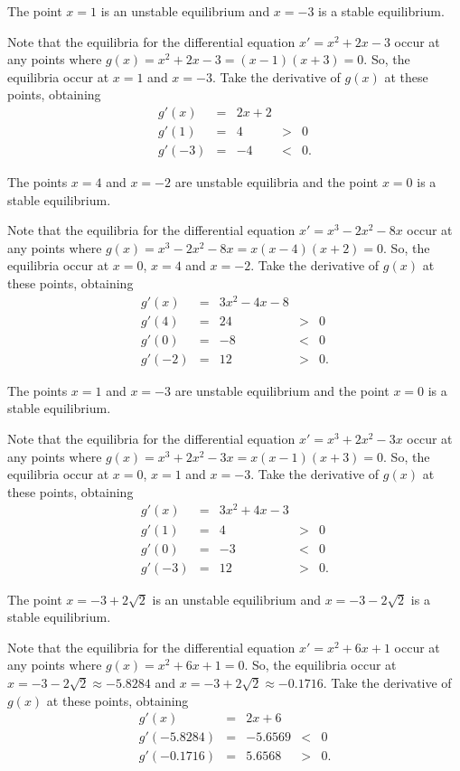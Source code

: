 \ans The point $x = 1$ is an unstable equilibrium and $x = -3$ is a stable
equilibrium.

\soln Note that the equilibria for the differential equation
$x' = x^2 + 2x - 3$ occur at any points where
$g(x) = x^2 + 2x - 3 = (x - 1)(x + 3) = 0$.
So, the equilibria occur at $x = 1$ and $x = -3$.  Take the
derivative of $g(x)$ at these points, obtaining
\[
\begin{array}{rcccl}
g'(x) & = & 2x + 2 \\
g'(1) & = & 4 & > & 0 \\
g'(-3) & = & -4 & < & 0.\end{array}
\]


\ans The points $x=4$ and $x = -2$ are unstable equilibria and the point 
$x = 0$ is a stable equilibrium.

\soln Note that the equilibria for the differential equation
$x' = x^3 - 2x^2 - 8x$ occur at any points where
$g(x) = x^3 - 2x^2 - 8x = x(x - 4)(x + 2) = 0$.
So, the equilibria occur at $x=0$, $x = 4$ and $x = -2$.  Take the
derivative of $g(x)$ at these points, obtaining
\[
\begin{array}{rcccl}
g'(x) & = & 3x^2-4x-8 \\
g'(4) & = & 24 & > & 0 \\
g'(0) & = & -8 & < & 0\\
g'(-2) & = & 12 & > & 0.\end{array}
\]

\ans The points $x=1$ and $x = -3$ are unstable equilibrium and the point 
$x = 0$ is a stable equilibrium.

\soln Note that the equilibria for the differential equation
$x' = x^3 + 2x^2 - 3x$ occur at any points where
$g(x) = x^3 + 2x^2 - 3x = x(x - 1)(x + 3) = 0$.
So, the equilibria occur at $x=0$, $x = 1$ and $x = -3$.  Take the
derivative of $g(x)$ at these points, obtaining
\[
\begin{array}{rcccl}
g'(x) & = & 3x^2+4x-3 \\
g'(1) & = & 4 & > & 0 \\
g'(0) & = & -3 & < & 0\\
g'(-3) & = & 12 & > & 0.\end{array}
\]

\ans The point $x = -3+2\sqrt{2}$ is an unstable equilibrium and 
$x = -3-2\sqrt{2}$ is a stable equilibrium.

\soln Note that the equilibria for the differential equation
$x' = x^2 + 6x + 1$ occur at any points where
$g(x) = x^2 + 6x + 1 = 0$.  So, the equilibria occur at $x =
-3-2\sqrt{2}\approx -5.8284$ and $x = -3+2\sqrt{2}\approx -0.1716$.  Take the
derivative of $g(x)$ at these points, obtaining
\[
\begin{array}{rcccl}
g'(x) & = & 2x + 6 \\
g'(-5.8284) & = & -5.6569 & < & 0 \\
g'(-0.1716) & = & 5.6568 & > & 0.\end{array}
\]

